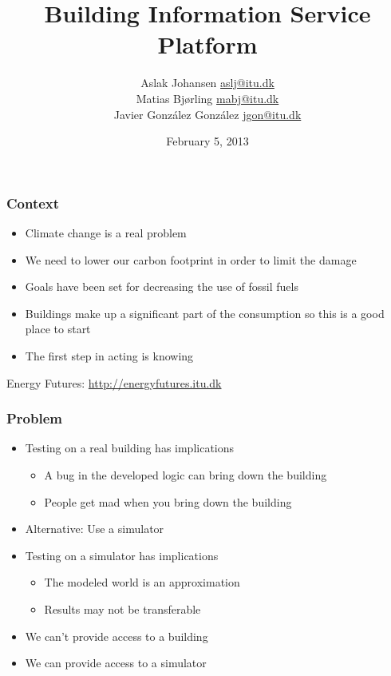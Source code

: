 \documentclass[t]{beamer}
\title{Building Information Service Platform\\\scalebox{0.85}{a Discrete Event Simulator for Building Modeling}}
\author{Aslak Johansen \url{aslj@itu.dk}\\Matias Bjørling \url{mabj@itu.dk}\\Javier González González \url{jgon@itu.dk}}
\date{February 5, 2013}
\begin{document}
\frame{\titlepage}

\begin{frame}
  \frametitle{Context}
  
  \begin{itemize}
    \item Climate change is a real problem
    \item We need to lower our carbon footprint in order to limit the damage
    \item Goals have been set for decreasing the use of fossil fuels
    \item Buildings make up a significant part of the consumption so this is a good place to start
    \item The first step in acting is knowing
  \end{itemize}
  
  Energy Futures: \url{http://energyfutures.itu.dk}
  
\end{frame}

\begin{frame}
  \frametitle{Problem}
  
  \begin{itemize}
    \item Testing on a real building has implications
      \begin{itemize}
        \item A bug in the developed logic can bring down the building
        \item People get mad when you bring down the building
      \end{itemize}
    \item Alternative: Use a simulator
    \item Testing on a simulator has implications
      \begin{itemize}
        \item The modeled world is an approximation
        \item Results may not be transferable
      \end{itemize}
  \end{itemize}
  
  \begin{itemize}
    \item We can't provide access to a building
    \item We can provide access to a simulator
  \end{itemize}
  
\end{frame}
\end{document}
